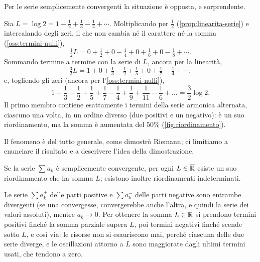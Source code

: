 Per le serie semplicemente convergenti la situazione è opposta, e sorprendente.

\begin{esempio}\label{es:riordinamento}
Sia $L=\log2=1-\frac12+\frac13-\frac14+\cdots$. Moltiplicando per $\frac12$ (\cref{prop:linearita-serie})
e intercalando degli zeri, il che non cambia né il carattere né la somma
(\cref{oss:termini-nulli}),
\[
  \tfrac12L=0+\tfrac12+0-\tfrac14+0+\tfrac16+0-\tfrac18+\cdots .
\]
Sommando termine a termine con la serie di $L$, ancora per la linearità,
\[
  \tfrac32L=1+0+\tfrac13-\tfrac12+\tfrac15+0+\tfrac17-\tfrac14+\cdots ,
\]
e, togliendo gli zeri (ancora per l'\cref{oss:termini-nulli}),
\begin{equation}\label{eq:riordinamento}
  1+\frac13-\frac12+\frac15+\frac17-\frac14+\frac19+\frac1{11}-\frac16+\dots=\frac32\log2 .
\end{equation}
Il primo membro contiene esattamente i termini della serie armonica alternata, ciascuno
una volta, in un ordine diverso (due positivi e un negativo): è un suo riordinamento, ma
la somma è aumentata del $50\%$ (\cref{fig:riordinamento}).
\end{esempio}

Il fenomeno è del tutto generale, come dimostrò Riemann; ci limitiamo a enunciare il
risultato e a descrivere l'idea della dimostrazione.

\begin{teorema}\label{teo:riemann-riordinamento}
Se la serie $\sum a_{k}$ è semplicemente convergente, per ogni $L\in\overline{\mathbb{R}}$ esiste un suo
riordinamento che ha somma $L$; esistono inoltre riordinamenti indeterminati.
\end{teorema}

\begin{schema}
\end{schema}

\begin{strategia}
Le serie $\sum a_{k}^{+}$ delle parti positive e $\sum a_{k}^{-}$ delle parti negative sono entrambe
divergenti (se una convergesse, convergerebbe anche l'altra, e quindi la serie dei valori
assoluti), mentre $a_{k}\to0$. Per ottenere la somma $L\in\mathbb{R}$ si prendono termini positivi
finché la somma parziale supera $L$, poi termini negativi finché scende sotto $L$, e così
via: le risorse non si esauriscono mai, perché ciascuna delle due serie diverge, e le
oscillazioni attorno a $L$ sono maggiorate dagli ultimi termini usati, che tendono a zero.
\end{strategia}


